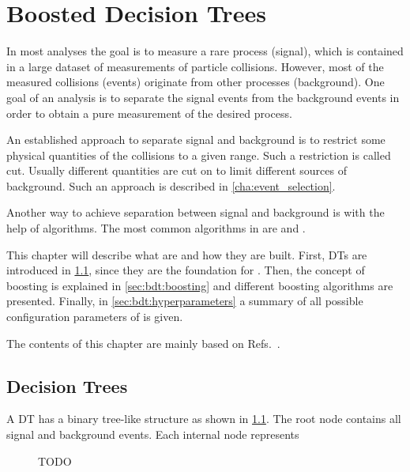 \chapter{Boosted Decision Trees}\label{cha:boosted_decision_trees}

In most \hep{} analyses the goal is to measure a rare process (signal), which is contained in a
large dataset of measurements of particle collisions.
However, most of the measured collisions (events) originate from other processes (background).
One goal of an analysis is to separate the signal events from the background events in order to obtain a pure
measurement of the desired process.

An established approach to separate signal and background is to restrict some physical quantities of the collisions
to a given range.
Such a restriction is called cut.
Usually different quantities are cut on to limit different sources of background.
Such an approach is described in \cref{cha:event_selection}.

Another way to achieve separation between signal and background is with the help of \ml{} algorithms.
The most common \ml{} algorithms in \hep{} are \bdts{} and \nns{}.

This chapter will describe what \bdts{} are and how they are built.
First, \glspl{DT} are introduced in \cref{sec:bdt:decision_trees}, since they are the foundation for \bdts.
Then, the concept of boosting is explained in \cref{sec:bdt:boosting} and different boosting algorithms are presented.
Finally, in \cref{sec:bdt:hyperparameters} a summary of all possible configuration parameters of \bdts{} is given.

The contents of this chapter are mainly based on Refs.~\cite{ML_HASTIE,ML_TMVA}.

\section{Decision Trees}\label{sec:bdt:decision_trees}

A \gls{DT} has a binary tree-like structure as shown in \cref{fig:decision_tree}.
The root node contains all signal and background events.
Each internal node represents

\begin{figure}[htb]
    \begin{center}
        \caption{TODO}
        \label{fig:decision_tree}
    \end{center}
\end{figure}

